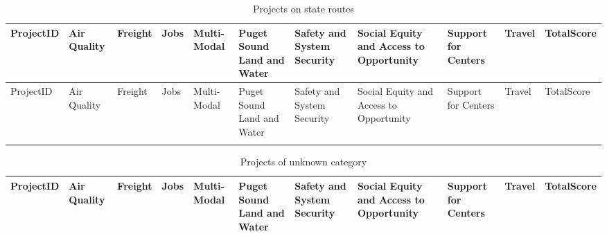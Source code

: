 \documentclass[10pt, letterpaper, final, twoside, onecolumn]{memoir}%
\begin{document}
\begin{landscape}
\clearpage
{\scriptsize
\begin{longtable}{>{\raggedright\arraybackslash}p{2.9pc}>{\raggedright\arraybackslash}p{3.5pc}>{\raggedright\arraybackslash}p{3.5pc}>{\raggedright\arraybackslash}p{3.5pc}>{\raggedright\arraybackslash}p{3.5pc}>{\raggedright\arraybackslash}p{3.5pc}>{\raggedright\arraybackslash}p{3.5pc}>{\raggedright\arraybackslash}p{3.5pc}>{\raggedright\arraybackslash}p{3.5pc}>{\raggedright\arraybackslash}p{3.5pc}>{\raggedright\arraybackslash}p{3.5pc}}

\caption{Projects on state routes} \\

\toprule

ProjectID & Air Quality & Freight & Jobs & Multi-Modal & Puget Sound Land and Water & Safety and System Security & Social Equity and Access to Opportunity & Support for Centers & Travel & TotalScore \\ \midrule
\endfirsthead

\toprule
ProjectID & Air Quality & Freight & Jobs & Multi-Modal & Puget Sound Land and Water & Safety and System Security & Social Equity and Access to Opportunity & Support for Centers & Travel & TotalScore \\ \midrule
\endhead

\bottomrule
\endfoot

\bottomrule
\endlastfoot



\end{longtable}}



{\scriptsize
\begin{longtable}{>{\raggedright\arraybackslash}p{2.9pc}>{\raggedright\arraybackslash}p{3.5pc}>{\raggedright\arraybackslash}p{3.5pc}>{\raggedright\arraybackslash}p{3.5pc}>{\raggedright\arraybackslash}p{3.5pc}>{\raggedright\arraybackslash}p{3.5pc}>{\raggedright\arraybackslash}p{3.5pc}>{\raggedright\arraybackslash}p{3.5pc}>{\raggedright\arraybackslash}p{3.5pc}>{\raggedright\arraybackslash}p{3.5pc}>{\raggedright\arraybackslash}p{3.5pc}}

\caption{Projects of unknown category} \\

\toprule

ProjectID & Air Quality & Freight & Jobs & Multi-Modal & Puget Sound Land and Water & Safety and System Security & Social Equity and Access to Opportunity & Support for Centers & Travel & TotalScore \\ \midrule
\endfirsthead


\end{longtable}}
\end{landscape}
\end{document}
